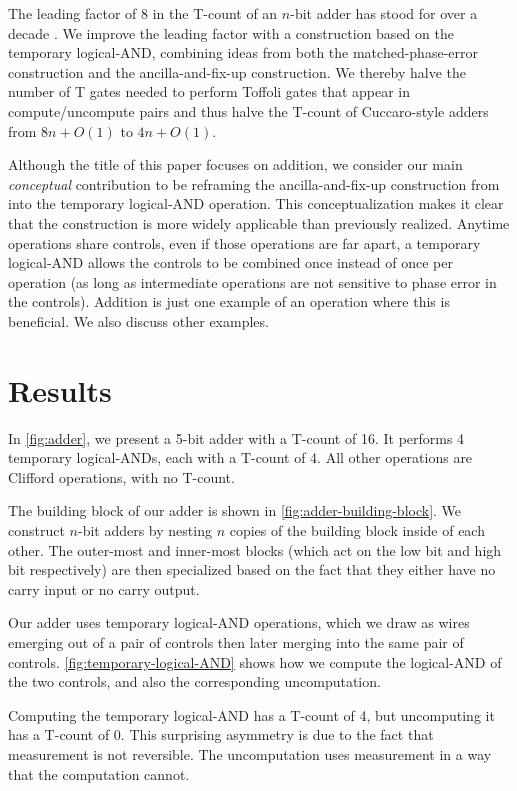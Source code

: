 \documentclass[twocolumn]{revtex4-1}
\begin{document}
The leading factor of 8 in the T-count of an $n$-bit adder has stood for over a decade \citep{Barenco1995, Cuccaro2004, AustinDiscussionsAndEmails2017}.
We improve the leading factor with a construction based on the temporary logical-AND, combining ideas from both the matched-phase-error construction and the ancilla-and-fix-up construction.
We thereby halve the number of T gates needed to perform Toffoli gates that appear in compute/uncompute pairs and thus halve the T-count of Cuccaro-style adders from $8n + O(1)$ to $4n + O(1)$.

Although the title of this paper focuses on addition, we consider our main {\em conceptual} contribution to be reframing the ancilla-and-fix-up construction from \cite{Jones2013} into the temporary logical-AND operation.
This conceptualization makes it clear that the construction is more widely applicable than previously realized.
Anytime operations share controls, even if those operations are far apart, a temporary logical-AND allows the controls to be combined once instead of once per operation (as long as intermediate operations are not sensitive to phase error in the controls).
Addition is just one example of an operation where this is beneficial.
We also discuss other examples.

\section*{Results}

In \autoref{fig:adder}, we present a 5-bit adder with a T-count of 16.
It performs 4 temporary logical-ANDs, each with a T-count of 4.
All other operations are Clifford operations, with no T-count.

The building block of our adder is shown in \autoref{fig:adder-building-block}.
We construct $n$-bit adders by nesting $n$ copies of the building block inside of each other.
The outer-most and inner-most blocks (which act on the low bit and high bit respectively) are then specialized based on the fact that they either have no carry input or no carry output.


Our adder uses temporary logical-AND operations, which we draw as wires emerging out of a pair of controls then later merging into the same pair of controls.
\autoref{fig:temporary-logical-AND} shows how we compute the logical-AND of the two controls, and also the corresponding uncomputation.

Computing the temporary logical-AND has a T-count of 4, but uncomputing it has a T-count of 0.
This surprising asymmetry is due to the fact that measurement is not reversible.
The uncomputation uses measurement in a way that the computation cannot.
\end{document}

